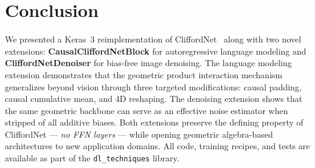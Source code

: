 \documentclass{article}
\begin{document}
\section{Conclusion}
\label{sec:conclusion}

We presented a Keras~3 reimplementation of CliffordNet~\citep{ji2026cliffordnet} along with two novel extensions: \textbf{CausalCliffordNetBlock} for autoregressive language modeling and \textbf{CliffordNetDenoiser} for bias-free image denoising.
The language modeling extension demonstrates that the geometric product interaction mechanism generalizes beyond vision through three targeted modifications: causal padding, causal cumulative mean, and 4D reshaping.
The denoising extension shows that the same geometric backbone can serve as an effective noise estimator when stripped of all additive biases.
Both extensions preserve the defining property of CliffordNet --- \emph{no FFN layers} --- while opening geometric algebra-based architectures to new application domains.
All code, training recipes, and tests are available as part of the \texttt{dl\_techniques} library.


\end{document}
